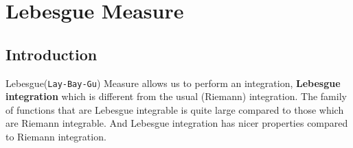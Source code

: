 

\section{Lebesgue Measure}
\subsection{Introduction}
	Lebesgue(\texttt{Lay-Bay-Gu}) Measure allows us to perform an integration, \textbf{Lebesgue integration} which is different from the usual (Riemann) integration. The family of functions that are Lebesgue integrable is quite large compared to those which are Riemann integrable. And Lebesgue integration has nicer properties compared to Riemann integration.

